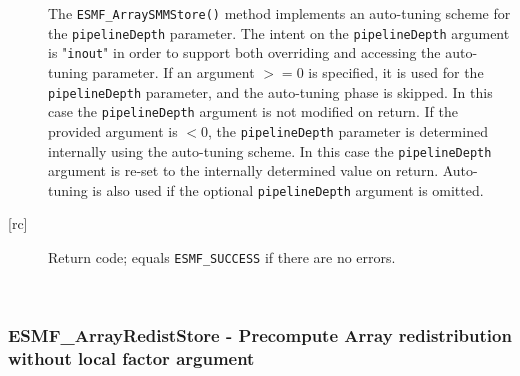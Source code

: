 \begin{description}
       The {\tt ESMF\_ArraySMMStore()} method implements an auto-tuning scheme
       for the {\tt pipelineDepth} parameter. The intent on the 
       {\tt pipelineDepth} argument is "{\tt inout}" in order to 
       support both overriding and accessing the auto-tuning parameter.
       If an argument $>= 0$ is specified, it is used for the 
       {\tt pipelineDepth} parameter, and the auto-tuning phase is skipped.
       In this case the {\tt pipelineDepth} argument is not modified on
       return. If the provided argument is $< 0$, the {\tt pipelineDepth}
       parameter is determined internally using the auto-tuning scheme. In this
       case the {\tt pipelineDepth} argument is re-set to the internally
       determined value on return. Auto-tuning is also used if the optional 
       {\tt pipelineDepth} argument is omitted.
  
     \item [{[rc]}]
       Return code; equals {\tt ESMF\_SUCCESS} if there are no errors.
     \end{description}
   
 
\mbox{}\hrulefill\ 
 
\subsubsection [ESMF\_ArrayRedistStore] {ESMF\_ArrayRedistStore - Precompute Array redistribution without local factor argument}


